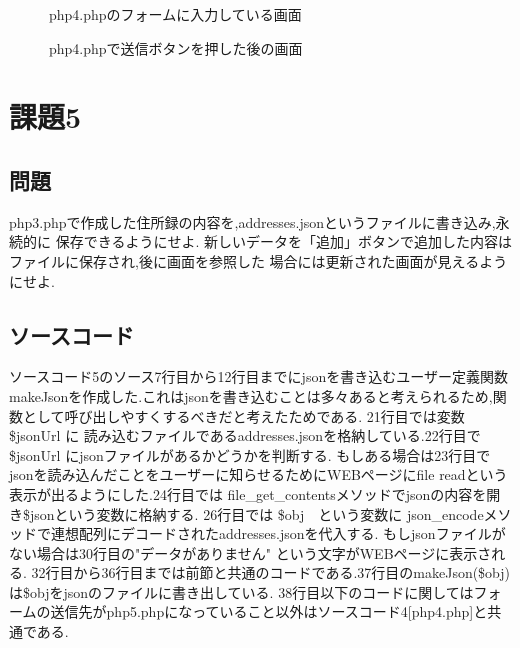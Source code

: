 \documentclass[a4j,10pt]{jsarticle}
\begin{document}
\begin{figure}[H]
  \centering
  \caption{php4.phpのフォームに入力している画面}
\label{fig:fig7}
\end{figure}

\begin{figure}[H]
  \centering
  \caption{php4.phpで送信ボタンを押した後の画面}
\label{fig:fig8}
\end{figure}
\section{課題5}

\subsection{問題}

  php3.phpで作成した住所録の内容を,addresses.jsonというファイルに書き込み,永続的に
  保存できるようにせよ.
  新しいデータを「追加」ボタンで追加した内容はファイルに保存され,後に画面を参照した
  場合には更新された画面が見えるようにせよ.

\subsection{ソースコード}

ソースコード5のソース7行目から12行目までにjsonを書き込むユーザー定義関数makeJsonを作成した.これはjsonを書き込むことは多々あると考えられるため,関数として呼び出しやすくするべきだと考えたためである.
21行目では変数 \$jsonUrl に 読み込むファイルであるaddresses.jsonを格納している.22行目で \$jsonUrl にjsonファイルがあるかどうかを判断する.
もしある場合は23行目でjsonを読み込んだことをユーザーに知らせるためにWEBページにfile readという表示が出るようにした.24行目では file\_get\_contentsメソッドでjsonの内容を開き\$jsonという変数に格納する.
26行目では \$obj　という変数に json\_encodeメソッドで連想配列にデコードされたaddresses.jsonを代入する.
もしjsonファイルがない場合は30行目の"データがありません" という文字がWEBページに表示される.
32行目から36行目までは前節と共通のコードである.37行目のmakeJson(\$obj)は\$objをjsonのファイルに書き出している.
38行目以下のコードに関してはフォームの送信先がphp5.phpになっていること以外はソースコード4[php4.php]と共通である.


\end{document}
